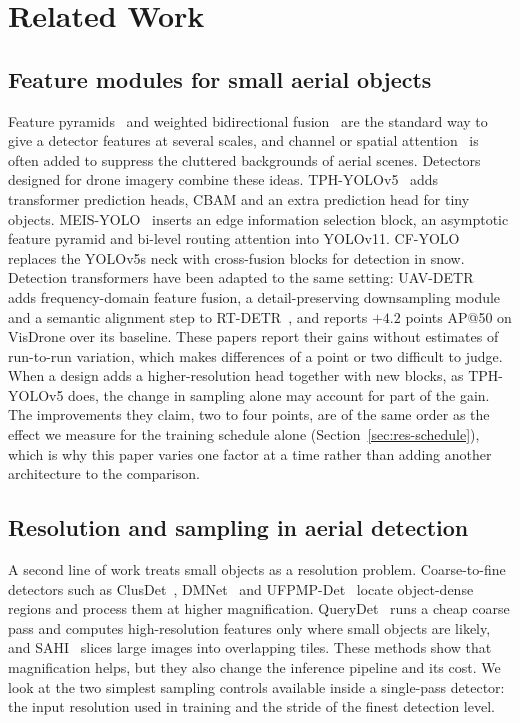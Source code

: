 \documentclass[preprint,12pt]{elsarticle}
\begin{document}
\section{Related Work}
\label{sec:related}

\subsection{Feature modules for small aerial objects}

Feature pyramids~\cite{fpn,panet} and weighted bidirectional
fusion~\cite{efficientdet} are the standard way to give a detector features at
several scales, and channel or spatial attention~\cite{senet,cbam,ecanet} is
often added to suppress the cluttered backgrounds of aerial scenes. Detectors
designed for drone imagery combine these ideas. TPH-YOLOv5~\cite{tph-yolo} adds
transformer prediction heads, CBAM and an extra prediction head for tiny objects.
MEIS-YOLO~\cite{meis-yolo} inserts an edge information selection block, an
asymptotic feature pyramid and bi-level routing attention into YOLOv11.
CF-YOLO~\cite{cf-yolo} replaces the YOLOv5s neck with cross-fusion blocks for
detection in snow. Detection transformers have been adapted to the same setting:
UAV-DETR~\cite{zhang2025uavdetr} adds frequency-domain feature fusion, a
detail-preserving downsampling module and a semantic alignment step to
RT-DETR~\cite{rtdetr}, and reports $+4.2$ points AP@50 on VisDrone over its
baseline. These papers report
their gains without estimates of
run-to-run variation, which makes differences of a point or two difficult to
judge. When a design adds a higher-resolution head together with new blocks, as
TPH-YOLOv5 does, the change in sampling alone may account for part of the gain.
The improvements they claim, two to four points, are of the same order as the
effect we measure for the training schedule alone (Section~\ref{sec:res-schedule}),
which is why this paper varies one factor at a time rather than adding another
architecture to the comparison.

\subsection{Resolution and sampling in aerial detection}

A second line of work treats small objects as a resolution problem. Coarse-to-fine
detectors such as ClusDet~\cite{clusdet}, DMNet~\cite{li2020dmnet} and
UFPMP-Det~\cite{huang2022ufpmp} locate object-dense regions and process them at
higher magnification. QueryDet~\cite{yang2022querydet} runs a cheap coarse pass
and computes high-resolution features only where small objects are likely, and
SAHI~\cite{akyon2022sahi} slices large images into overlapping tiles. These
methods show that magnification helps, but they also change the inference pipeline
and its cost. We look at the two simplest sampling controls available inside a
single-pass detector: the input resolution used in training and the stride of the
finest detection level.
\end{document}
